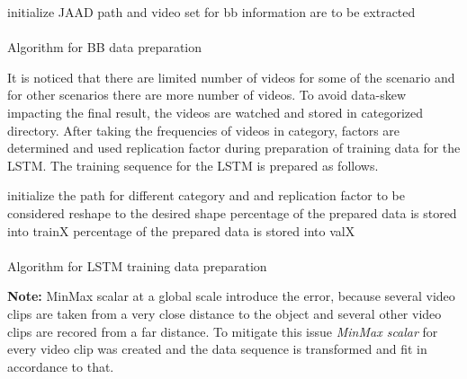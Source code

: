 \begin{algorithm}[H]
\SetAlgoLined
{}
 initialize JAAD path and video set for bb information are to be extracted \;
~\\
~\\
 \caption{Algorithm for BB data preparation}
\end{algorithm}

It is noticed that there are limited number of videos for some of the scenario and for other scenarios there are more number of videos. To avoid data-skew impacting the final result, the videos are watched and stored in categorized directory. After taking the frequencies of videos in category, factors are determined  and used  replication factor during preparation of training data for the LSTM. The training sequence for the LSTM is prepared as follows.

\begin{algorithm}[H]
\SetAlgoLined
{}
 initialize the path for different category and and replication factor to be considered \;
reshape to the desired shape percentage of the prepared data is stored into train\textunderscore X percentage of the prepared data is stored into val\textunderscore X\; 
~\\
~\\
 \caption{Algorithm for LSTM training data preparation}
\end{algorithm}

\textbf{Note:} MinMax scalar at a global scale introduce the error, because several video clips are taken from a very close distance to the object and several other video clips are recored from a far distance. To mitigate this issue \textit{MinMax scalar } for every video clip was created and the data sequence is transformed and fit in accordance to that.

